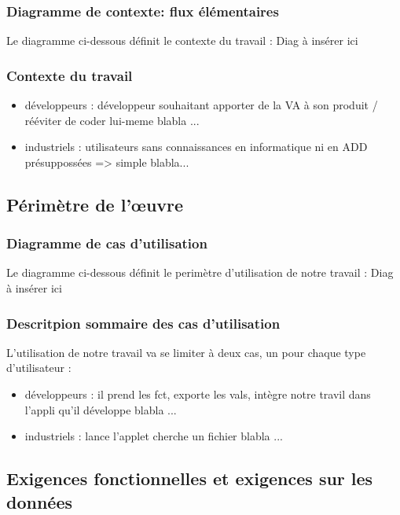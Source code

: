 			\subsubsection{Diagramme de contexte: flux élémentaires}
				Le diagramme ci-dessous définit le contexte du travail :
					{\color{red}
					Diag à insérer ici
					}
			
			\subsubsection{Contexte du travail}
				\begin{itemize}
				\item développeurs : {\color{red} développeur souhaitant apporter de la VA à son produit / rééviter de coder lui-meme blabla ...}
				\item industriels : {\color{red} utilisateurs sans connaissances en informatique ni en ADD présuppossées => simple blabla...}
				\end{itemize}
				
		\subsection{Périmètre de l'œuvre}
		
			\subsubsection{Diagramme de cas d'utilisation}
				Le diagramme ci-dessous définit le perimètre d'utilisation de notre travail :
					{\color{red}
					Diag à insérer ici
					}
				
			\subsubsection{Descritpion sommaire des cas d'utilisation}
				L'utilisation de notre travail va se limiter à deux cas, un pour chaque type d'utilisateur :
				\begin{itemize}
				\item développeurs : {\color{red} il prend les fct, exporte les vals, intègre notre travil dans l'appli qu'il développe blabla ...}
				\item industriels : {\color{red} lance l'applet cherche un fichier blabla ...}
				\end{itemize}
				
		\subsection{Exigences fonctionnelles et exigences sur les données}
		
